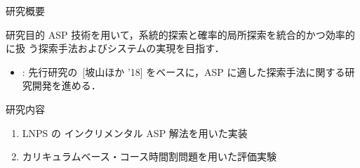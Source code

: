 \documentclass[11pt,dvipdfmx]{beamer}
\begin{document}
\begin{frame}{研究概要}
  \begin{alertblock}{研究目的}\centering
    ASP 技術を用いて，系統的探索と確率的局所探索を統合的かつ効率的に扱
    う探索手法およびシステムの実現を目指す．
  \end{alertblock}

  \begin{itemize}
  \item {}:
    先行研究の~[坡山ほか '18]
    をベースに，ASP に適した探索手法に関する研究開発を進める．
  \end{itemize}

  \begin{block}{研究内容}
    \begin{enumerate}
    \item LNPS の インクリメンタル ASP 解法を用いた実装
    \item カリキュラムベース・コース時間割問題を用いた評価実験
    \end{enumerate}
  \end{block}
\end{frame}
\end{document}
